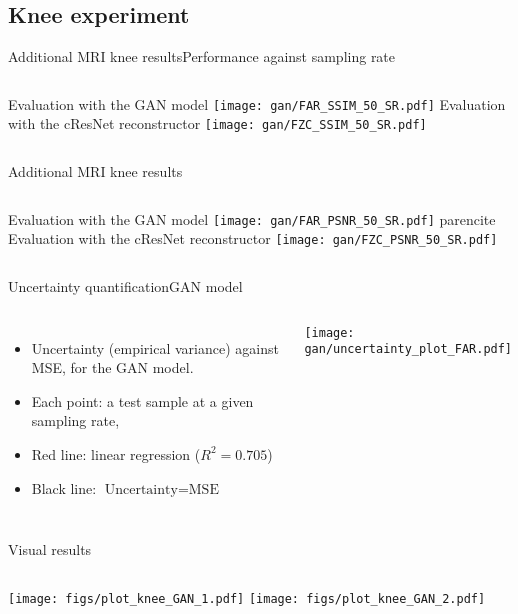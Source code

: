 \subsection{Knee experiment}
\begin{frame}{Additional MRI knee results}{Performance against sampling rate}
    \begin{columns}
        \centering
        Evaluation with the GAN model
        \texttt{[image: gan/FAR\_SSIM\_50\_SR.pdf]}
        \centering
        Evaluation with the cResNet reconstructor
        \texttt{[image: gan/FZC\_SSIM\_50\_SR.pdf]}
    \end{columns}
\end{frame}
\begin{frame}{Additional MRI knee results}
\begin{columns}
    \centering
    Evaluation with the GAN model
    \texttt{[image: gan/FAR\_PSNR\_50\_SR.pdf]}
    parencite
    \centering
    Evaluation with the cResNet reconstructor
    \texttt{[image: gan/FZC\_PSNR\_50\_SR.pdf]}
\end{columns}
\end{frame}


\begin{frame}{Uncertainty quantification}{GAN model}
    \begin{columns}
        \begin{itemize}
            \item Uncertainty (empirical variance) against MSE, for the GAN model.
            \item Each point: a test sample at a given sampling rate,
            \item Red line: linear regression ($R^2=0.705$)
            \item Black line: $\text{Uncertainty}=\text{MSE}$
        \end{itemize}

        \texttt{[image: gan/uncertainty\_plot\_FAR.pdf]}
    \end{columns}
\end{frame}



\begin{frame}{Visual results}
    \begin{columns}
            \texttt{[image: figs/plot\_knee\_GAN\_1.pdf]}%
            \texttt{[image: figs/plot\_knee\_GAN\_2.pdf]}
    \end{columns}
\end{frame}

